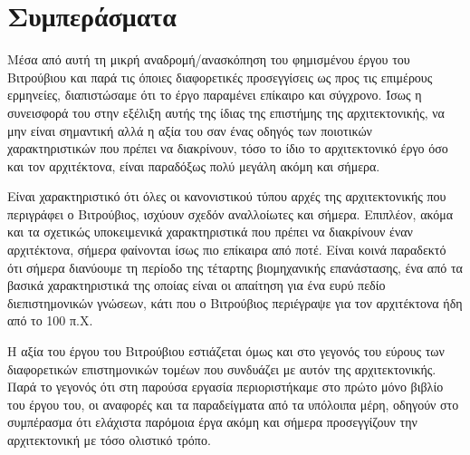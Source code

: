 \section{Συμπεράσματα}

Μέσα από αυτή τη μικρή αναδρομή/ανασκόπηση του φημισμένου έργου του Βιτρούβιου και παρά τις όποιες διαφορετικές προσεγγίσεις ως προς τις επιμέρους ερμηνείες, διαπιστώσαμε ότι το έργο παραμένει επίκαιρο και σύγχρονο. Ίσως η συνεισφορά του στην εξέλιξη αυτής της ίδιας της επιστήμης της αρχιτεκτονικής, να μην είναι σημαντική αλλά η αξία του σαν ένας οδηγός των ποιοτικών χαρακτηριστικών που πρέπει να διακρίνουν, τόσο το ίδιο το αρχιτεκτονικό έργο όσο και τον αρχιτέκτονα, είναι παραδόξως πολύ μεγάλη ακόμη και σήμερα.

Είναι χαρακτηριστικό ότι όλες οι κανονιστικού τύπου αρχές της αρχιτεκτονικής 
που περιγράφει ο Βιτρούβιος, ισχύουν σχεδόν αναλλοίωτες και σήμερα. Επιπλέον, 
ακόμα και τα σχετικώς υποκειμενικά χαρακτηριστικά που πρέπει να διακρίνουν έναν 
αρχιτέκτονα, σήμερα φαίνονται ίσως πιο επίκαιρα από ποτέ. Είναι κοινά παραδεκτό 
ότι σήμερα διανύουμε τη περίοδο της τέταρτης βιομηχανικής επανάστασης, ένα από 
τα βασικά χαρακτηριστικά της οποίας είναι οι απαίτηση για ένα ευρύ πεδίο 
διεπιστημονικών γνώσεων, κάτι που ο Βιτρούβιος περιέγραψε για τον αρχιτέκτονα 
ήδη από το 100 π.Χ.

Η αξία του έργου του Βιτρούβιου εστιάζεται όμως και στο γεγονός του εύρους των 
διαφορετικών επιστημονικών τομέων που συνδυάζει με αυτόν της αρχιτεκτονικής. 
Παρά το γεγονός ότι στη παρούσα εργασία περιοριστήκαμε στο πρώτο μόνο βιβλίο 
του έργου του, οι αναφορές και τα παραδείγματα από τα υπόλοιπα μέρη, οδηγούν 
στο συμπέρασμα ότι ελάχιστα παρόμοια έργα ακόμη και σήμερα προσεγγίζουν την 
αρχιτεκτονική με τόσο ολιστικό τρόπο. 